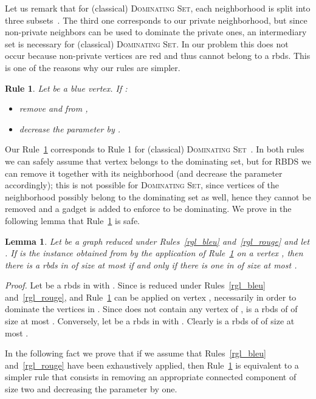 \documentclass[a4paper,11pt]{article}
\newtheorem{lem}  {Lemma}
\newtheorem{rgl}  {Rule}
\newcommand{\rrgl}   [1] {Rule~\ref{#1}\xspace}
\newcommand{\dom}    [0] {\textsc{Dominating Set}\xspace}
\newcommand{\drb}    [0] {rbds\xspace}
\newcommand{\RBDS}{\textsc{RBDS}\xspace}
\newenvironment{proof}{\noindent \textit{Proof. }}{\hfill\vspace{.2cm}}
\begin{document}
Let us remark that for (classical) \dom, each neighborhood is split into three subsets~\cite{AFN04}. The third one corresponds to our private neighborhood, but since non-private neighbors can be used to dominate the private ones, an intermediary set is necessary for (classical) \dom. In our problem this does not occur because non-private vertices are red and thus cannot belong to a \drb. This is one of the reasons why our rules are simpler.

\begin{rgl}  \label{rgl_som}
Let  be a blue vertex. If :
\begin{itemize}\itemsep0em
\item remove  and  from ,
\item decrease the parameter  by .
\end{itemize}

\end{rgl}

Our \rrgl{rgl_som} corresponds to Rule 1 for (classical) \dom~\cite{AFN04}. In both rules we can safely assume that vertex  belongs to the dominating set, but for \RBDS we can remove it together with its neighborhood (and decrease the parameter accordingly); this is not possible for \dom, since vertices of the neighborhood possibly belong to the dominating set as well, hence they cannot be removed and a gadget is added to enforce  to be dominating. We prove in the following lemma that \rrgl{rgl_som} is safe.

\begin{lem} \label{lem_corr_1}
Let  be a graph reduced under Rules~\ref{rgl_bleu} and~\ref{rgl_rouge} and let .
If  is the instance obtained from  by the application of \rrgl{rgl_som} on a vertex ,
then there is a \drb in  of size at most  if and only if there is one in  of size at most .
\end{lem}

\begin{proof}
Let  be a \drb in  with . Since  is reduced under Rules~\ref{rgl_bleu}  and~\ref{rgl_rouge}, and \rrgl{rgl_som} can be applied on vertex , necessarily  in order to dominate the vertices in . Since  does not contain any vertex of ,  is a \drb of  of size at most .
Conversely, let  be a \drb in  with . Clearly  is a \drb of  of size at most .
\end{proof}

In the following fact we prove that if we assume that Rules~\ref{rgl_bleu} and~\ref{rgl_rouge} have been exhaustively applied, then \rrgl{rgl_som} is equivalent to a simpler rule that consists in removing an appropriate connected component of size two and decreasing the parameter by one.
\end{document}
